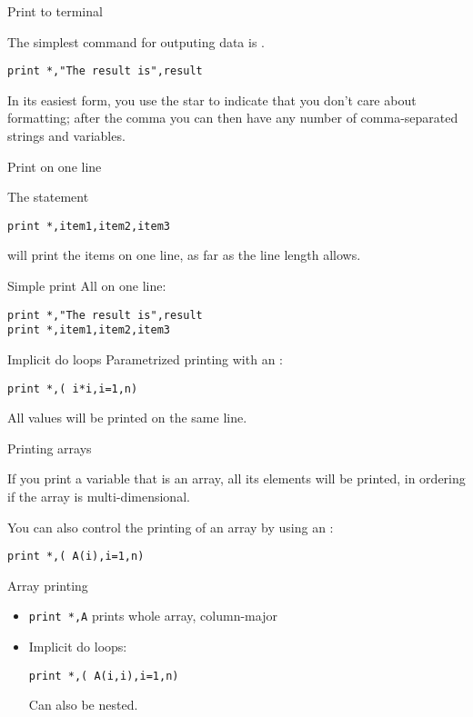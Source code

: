  {Print to terminal}

The simplest command for outputing data is .
\begin{lstlisting}
print *,"The result is",result
\end{lstlisting}
In its easiest form, you use the star to indicate that you don't care
about formatting; after the comma you can then have any number of
comma-separated strings and variables.

 {Print on one line}

The statement
\begin{lstlisting}
print *,item1,item2,item3
\end{lstlisting}
will print the items on one line, as far as the line length allows.

\begin{slide}{Simple print}
  \label{sl:fio-print}
  All on one line:
\begin{lstlisting}
print *,"The result is",result
print *,item1,item2,item3
\end{lstlisting}
\end{slide}

\begin{block}{Implicit do loops}
  \label{sl:print-implicit-loop}
  Parametrized printing with an :
\begin{lstlisting}
print *,( i*i,i=1,n)
\end{lstlisting}
All values will be printed on the same line.
\end{block}

 {Printing arrays}

If you print a variable that is an array, all its elements will be
printed, in  ordering if the array is
multi-dimensional.

You can also control the printing of an array by using an
:
\begin{lstlisting}
print *,( A(i),i=1,n)
\end{lstlisting}

\begin{slide}{Array printing}
  \label{sl:fprint-array}
  \begin{itemize}
  \item \lstinline{print *,A} prints whole array, column-major
  \item Implicit do loops:
\begin{lstlisting}
print *,( A(i,i),i=1,n)
\end{lstlisting}
  Can also be nested.
  \end{itemize}
\end{slide}

